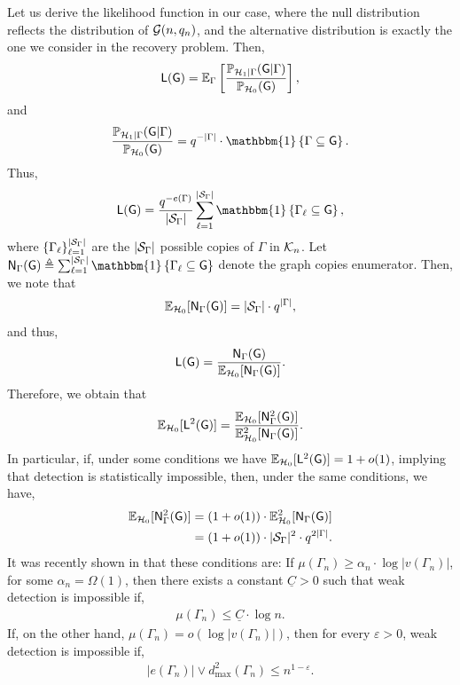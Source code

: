 \documentclass[12pt]{article}
\newcommand{\bE}{\mathbb{E}}
\newcommand{\Ind}{\mathbbm{1}}
\newcommand {\pr} {\mathbb{P}}
\newcommand{\calG}{{\cal G}}
\newcommand{\calH}{{\cal H}}
\newcommand{\calK}{{\cal K}}
\newcommand{\calS}{{\cal S}}
\newcommand{\pp}[1]{\left[#1\right]}
\newcommand{\ppp}[1]{\left\{#1\right\}}
\newcommand{\s}[1]{\mathsf{#1}}
\begin{document}
Let us derive the likelihood function in our case, where the null distribution reflects the distribution of $\calG(n,q_n)$, and the alternative distribution is exactly the one we consider in the recovery problem. Then,
\begin{align}
    \s{L}(\s{G}) = \bE_{\Gamma}\pp{\frac{\pr_{\calH_1\vert\Gamma}(\s{G}\vert\Gamma)}{\pr_{\calH_0}(\s{G})}},
\end{align}
and
\begin{align}
    \frac{\pr_{\calH_1\vert\Gamma}(\s{G}\vert\Gamma)}{\pr_{\calH_0}(\s{G})} = q^{-|\Gamma|}\cdot\Ind\ppp{\Gamma\subseteq \s{G}}.
\end{align}
Thus,
\begin{align}
    \s{L}(\s{G}) = \frac{q^{-e(\Gamma)}}{|\calS_\Gamma|}\sum_{\ell=1}^{|\calS_\Gamma|}\Ind\ppp{\Gamma_\ell\subseteq \s{G}},
\end{align}
where $\{\Gamma_\ell\}_{\ell=1}^{|\calS_\Gamma|}$ are the $|\calS_\Gamma|$ possible copies of $\Gamma$ in $\calK_n$. Let $\s{N}_{\Gamma}(\s{G})\triangleq\sum_{\ell=1}^{|\calS_\Gamma|}\Ind\ppp{\Gamma_\ell\subseteq \s{G}}$ denote the graph copies enumerator. Then, we note that
\begin{align}
    \bE_{\calH_0}[\s{N}_{\Gamma}(\s{G})] = |\calS_\Gamma|\cdot q^{|\Gamma|},
\end{align}
and thus,
\begin{align}
    \s{L}(\s{G}) = \frac{\s{N}_{\Gamma}(\s{G})}{\bE_{\calH_0}[\s{N}_{\Gamma}(\s{G})]}.
\end{align}
Therefore, we obtain that
\begin{align}
    \bE_{\calH_0}[\s{L}^2(\s{G})] = \frac{\bE_{\calH_0}[\s{N}_{\Gamma}^2(\s{G})]}{\bE_{\calH_0}^2[\s{N}_{\Gamma}(\s{G})]}. \label{eqn:secondmomentEnumerator}
\end{align}
In particular, if, under some conditions we have $\bE_{\calH_0}[\s{L}^2(\s{G})]=1+o(1)$, implying that detection is statistically impossible, then, under the same conditions, we have,
\begin{align}
    \bE_{\calH_0}[\s{N}_{\Gamma}^2(\s{G})] &= (1+o(1))\cdot\bE_{\calH_0}^2[\s{N}_{\Gamma}(\s{G})] \\
    & = (1+o(1))\cdot|\calS_\Gamma|^2\cdot q^{2|\Gamma|}.\label{eqn:detectionGur}
\end{align}
It was recently shown in \cite{elimelech2025detecting} that these conditions are: If $\mu(\Gamma_n)\geq \alpha_n\cdot \log|v(\Gamma_n)|$, for some $\alpha_n=\Omega(1)$, then there exists a constant $\underline{C}>0$ such that weak detection is impossible if, 
    \begin{align}
        \mu(\Gamma_n)\leq \underline{C}\cdot \log n.\label{eq:condDenseStatproof}
    \end{align}
If, on the other hand, $\mu(\Gamma_n)=o(\log|v(\Gamma_n)|)$, then for every $\varepsilon>0$, weak detection is impossible if,
    \begin{align}
        |e(\Gamma_n)|\vee d^2_{\max}(\Gamma_n)\leq n^{1-\varepsilon}.\label{eq:condDenseStat2proof}
    \end{align}
\end{document}
